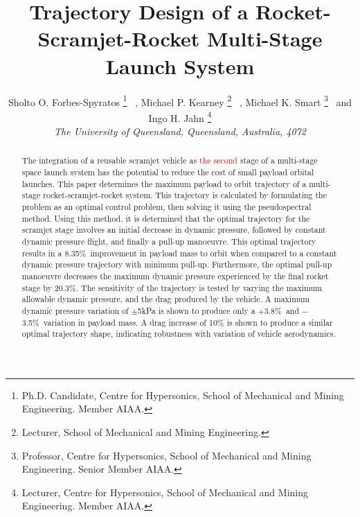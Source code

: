\documentclass[journal]{new-aiaa}
\newcommand{\PayloadImprovement}{8.35\%}
\newcommand{\qDecrease}{20.3\%}
\newcommand{\qVariationPlus}{$+$3.8\%}
\newcommand{\qVariationMinus}{$-$3.5\%}
\begin{document}

\title{Trajectory Design of a Rocket-Scramjet-Rocket Multi-Stage Launch System} %




 \author{
 	Sholto O. Forbes-Spyratos%
 	\thanks{Ph.D. Candidate, Centre for Hypersonics, School of Mechanical and Mining Engineering. Member AIAA.}
 	\ ,  Michael P. Kearney
 	\thanks{Lecturer, School of Mechanical and Mining Engineering.}
 	\ ,  Michael K. Smart
 	\thanks{Professor, Centre for Hypersonics, School of Mechanical and Mining Engineering. Senior Member AIAA.}
 	\ and   Ingo H. Jahn
 	\thanks{Lecturer, Centre for Hypersonics, School of Mechanical and Mining Engineering. Member AIAA.}
 	\\
 	{\normalsize\itshape
 		The University of Queensland, Queensland, Australia, 4072}\\
 }



\maketitle

\begin{abstract}

The integration of a reusable scramjet vehicle as \textcolor{red}{the second} stage of a multi-stage space launch system has the potential to reduce the cost of small payload orbital launches. 
This paper determines the maximum payload to orbit trajectory of a multi-stage rocket-scramjet-rocket system. This trajectory is calculated by formulating the problem as an optimal control problem, then solving it using the pseudospectral method. 
Using this method, it is determined that the optimal trajectory for the scramjet stage involves an initial decrease in dynamic pressure, followed by constant dynamic pressure flight, and finally a pull-up manoeuvre. This optimal trajectory results in a \PayloadImprovement\ improvement in payload mass to orbit when compared to a constant dynamic pressure trajectory with minimum pull-up. 
Furthermore, the optimal pull-up manoeuvre decreases the maximum dynamic pressure experienced by the final rocket stage by \qDecrease. 
The sensitivity of the trajectory is tested by varying the maximum allowable dynamic pressure, and the drag produced by the vehicle. 
A maximum dynamic pressure variation of $\pm$5kPa is shown to produce only a \qVariationPlus\ and \qVariationMinus\ variation in payload mass. A drag increase of 10\% is shown to produce a similar optimal trajectory shape, indicating robustness with variation of vehicle aerodynamics. 


\end{abstract}
\end{document}
